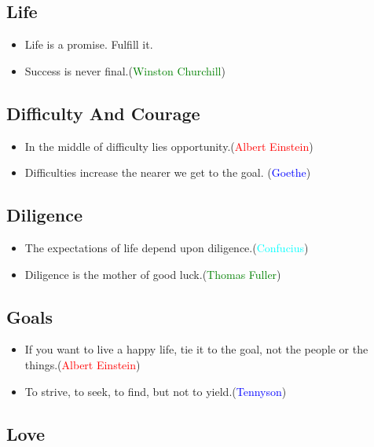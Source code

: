 \documentclass{article}
\begin{document}
\subsection{Life}
\label{sec:life}

\begin{itemize}
\item Life is a promise. Fulfill it.
\item Success is never final.(\textcolor{green}{Winston Churchill})
\end{itemize}

\subsection{Difficulty And Courage}
\label{sec:difficulty-courage}
\begin{itemize}
\item In the middle of difficulty lies opportunity.(\textcolor{red}{Albert Einstein})
\item Difficulties increase the nearer we get to the goal. (\textcolor{blue}{Goethe})
\end{itemize}

\subsection{Diligence}
\label{sec:diligence}

\begin{itemize}
\item The expectations of life depend upon diligence.(\textcolor{cyan}{Confucius})
\item Diligence is the mother of good luck.(\textcolor{green}{Thomas Fuller})
\end{itemize}

\subsection{Goals}
\label{sec:goals}

\begin{itemize}
\item If you want to live a happy life, tie it to the goal, not the people or the
  things.(\textcolor{red}{Albert Einstein})
\item To strive, to seek, to find, but not to yield.(\textcolor{blue}{Tennyson})
\end{itemize}

\subsection{Love}
\label{sec:love}
\end{document}
